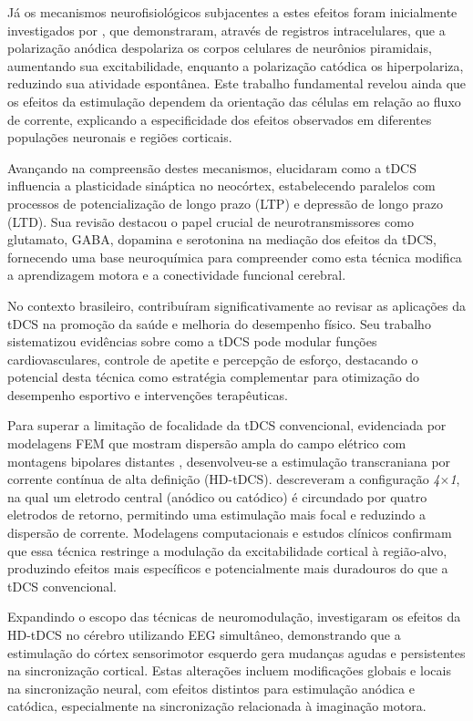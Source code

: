 Já os mecanismos neurofisiológicos subjacentes a estes efeitos foram inicialmente investigados por , que demonstraram, através de registros intracelulares, que a polarização anódica despolariza os corpos celulares de neurônios piramidais, aumentando sua excitabilidade, enquanto a polarização catódica os hiperpolariza, reduzindo sua atividade espontânea. Este trabalho fundamental revelou ainda que os efeitos da estimulação dependem da orientação das células em relação ao fluxo de corrente, explicando a especificidade dos efeitos observados em diferentes populações neuronais e regiões corticais.

Avançando na compreensão destes mecanismos,  elucidaram como a tDCS influencia a plasticidade sináptica no neocórtex, estabelecendo paralelos com processos de potencialização de longo prazo (LTP) e depressão de longo prazo (LTD). Sua revisão destacou o papel crucial de neurotransmissores como glutamato, GABA, dopamina e serotonina na mediação dos efeitos da tDCS, fornecendo uma base neuroquímica para compreender como esta técnica modifica a aprendizagem motora e a conectividade funcional cerebral.

No contexto brasileiro,  contribuíram significativamente ao revisar as aplicações da tDCS na promoção da saúde e melhoria do desempenho físico. Seu trabalho sistematizou evidências sobre como a tDCS pode modular funções cardiovasculares, controle de apetite e percepção de esforço, destacando o potencial desta técnica como estratégia complementar para otimização do desempenho esportivo e intervenções terapêuticas.


Para superar a limitação de focalidade da tDCS convencional, evidenciada por modelagens FEM que mostram dispersão ampla do campo elétrico com montagens bipolares distantes \cite{datta2008transcranial}, desenvolveu-se a estimulação transcraniana por corrente contínua de alta definição (HD-tDCS).  descreveram a configuração \emph{4$\times$1}, na qual um eletrodo central (anódico ou catódico) é circundado por quatro eletrodos de retorno, permitindo uma estimulação mais focal e reduzindo a dispersão de corrente. Modelagens computacionais e estudos clínicos confirmam que essa técnica restringe a modulação da excitabilidade cortical à região-alvo, produzindo efeitos mais específicos e potencialmente mais duradouros do que a tDCS convencional.

Expandindo o escopo das técnicas de neuromodulação,  investigaram os efeitos da HD-tDCS no cérebro utilizando EEG simultâneo, demonstrando que a estimulação do córtex sensorimotor esquerdo gera mudanças agudas e persistentes na sincronização cortical. Estas alterações incluem modificações globais e locais na sincronização neural, com efeitos distintos para estimulação anódica e catódica, especialmente na sincronização relacionada à imaginação motora.

